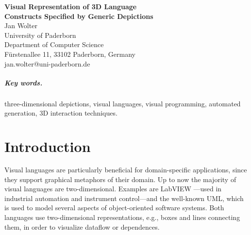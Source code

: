 \documentclass[a4paper]{article}
\newcommand{\dev}{DEViL3D\xspace}
\begin{document}
\begin{center}
\textbf{\Large  Visual Representation of 3D Language \\[3pt]Constructs Specified by Generic Depictions}\\[10pt]
  Jan Wolter \\
  University of Paderborn \\
  Department of Computer Science  \\
  F\"{u}rstenallee 11, 33102 Paderborn, Germany   \\
  jan.wolter@uni-paderborn.de
\end{center}

\begin{abstract}

Several modeling domains make use of three-dimensional representations, e.g., the ``ball-and-stick'' models of molecules. Our generator framework \dev supports the design and implementation of visual 3D languages for such modeling purposes. The front-end of a language implementation generated by \dev is a dedicated 3D graphical structure editor, which is used to construct programs in that domain. \dev supports the language designer to describe the visual appearance of the constructs of the particular language in terms of generic 3D depictions. Their parameters specify where substructures are embedded, and how the graphic adapts to space requirements of nested constructs. The 3D editor used for such specifications is generated by \dev, too. In this paper, we briefly introduce the research field of 3D visual languages and report about our generator framework and the role that generic depictions play in the specification process for 3D languages. Our results show that our approach is suitable for a wide range of 3D languages. We emphasize this suitability by presenting requirements on the visual appearance for different languages.


\end{abstract}

\subparagraph{Key words.} three-dimensional depictions, visual languages, visual programming, automated generation, 3D interaction techniques.

\tableofcontents
\pagebreak

\section{Introduction}
\label{sec:intro}
Visual languages are particularly beneficial for domain-specific applications, since they support graphical metaphors of their domain. Up to now the majority of visual languages are two-dimensional. Examples are LabVIEW \cite{labview}---used in industrial automation and instrument control---and the well-known UML, which is used to model several aspects of object-oriented software systems. Both languages use two-dimensional representations, e.g., boxes and lines connecting them, in order to visualize dataflow or dependences.
\end{document}
